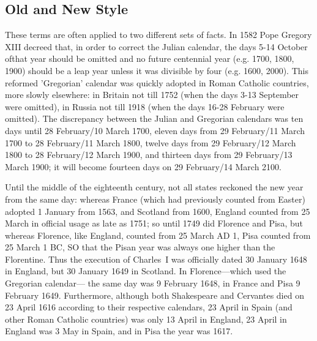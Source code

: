 \subsection{Old and New Style}

These terms are often applied to two different sets of facts. In 1582 Pope
Gregory XIII decreed that, in order to correct the Julian calendar, the
days 5-14 October ofthat year should be omitted and no future centennial
year (e.g. 1700, 1800, 1900) should be a leap year unless it was
divisible by four (e.g. 1600, 2000). This reformed 'Gregorian' calendar
was quickly adopted in Roman Catholic countries, more slowly elsewhere:
in Britain not till 1752 (when the days 3-13 September were
omitted), in Russia not till 1918 (when the days 16-28 February were
omitted). The discrepancy between the Julian and Gregorian calendars
was ten days until 28 February/10 March 1700, eleven days from 29
February/11 March 1700 to 28 February/11 March 1800, twelve days
from 29 February/12 March 1800 to 28 February/12 March 1900, and
thirteen days from 29 February/13 March 1900; it will become fourteen
days on 29 February/14 March 2100.

Until the middle of the eighteenth century, not all states reckoned the
new year from the same day: whereas France (which had previously
counted from Easter) adopted 1 January from 1563, and Scotland from
1600, England counted from 25 March in official usage as late as 1751; so
until 1749 did Florence and Pisa, but whereas Florence, like England,
counted from 25 March AD 1, Pisa counted from 25 March 1 BC, SO that the
Pisan year was always one higher than the Florentine. Thus the execution
of Charles~I was officially dated 30 January 1648 in England, but 30
January 1649 in Scotland. In Florence---which used the Gregorian calendar---
the same day was 9 February 1648, in France and Pisa 9 February
1649. Furthermore, although both Shakespeare and Cervantes died on 23
April 1616 according to their respective calendars, 23 April in Spain (and
other Roman Catholic countries) was only 13 April in England, 23 April in
England was 3 May in Spain, and in Pisa the year was 1617.

